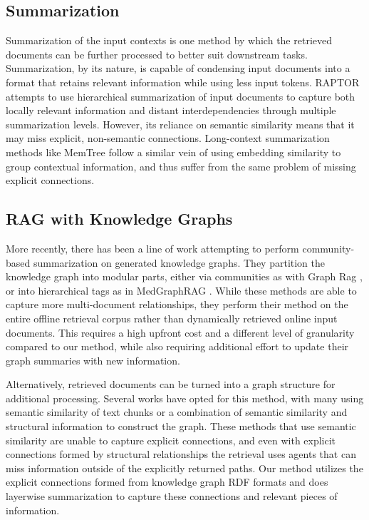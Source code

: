 \documentclass[11pt]{article}
\theoremstyle{definition}
\begin{document}
\subsection{Summarization}
Summarization of the input contexts is one method by which the retrieved documents can be further processed to better suit downstream tasks. Summarization, by its nature, is capable of condensing input documents into a format that retains relevant information while using less input tokens. RAPTOR \cite{DBLP:conf/iclr/SarthiATKGM24} attempts to use hierarchical summarization of input documents to capture both locally relevant information and distant interdependencies through multiple summarization levels. However, its reliance on semantic similarity means that it may miss explicit, non-semantic connections. Long-context summarization methods like MemTree \cite{DBLP:journals/corr/abs-2410-14052} follow a similar vein of using embedding similarity to group contextual information, and thus suffer from the same problem of missing explicit connections. 

\subsection{RAG with Knowledge Graphs}
More recently, there has been a line of work attempting to perform community-based summarization on generated knowledge graphs. They partition the knowledge graph into modular parts, either via communities as with Graph Rag \cite{DBLP:journals/corr/abs-2404-16130}, or into hierarchical tags as in MedGraphRAG \cite{DBLP:journals/corr/abs-2408-04187}. While these methods are able to capture more multi-document relationships, they perform their method on the entire offline retrieval corpus rather than dynamically retrieved online input documents. This requires a high upfront cost and a different level of granularity compared to our method, while also requiring additional effort to update their graph summaries with new information. 

Alternatively, retrieved documents can be turned into a graph structure for additional processing. Several works have opted for this method, with many using semantic similarity of text chunks or a combination of semantic similarity and structural information \cite{DBLP:conf/aaai/0160LRSZD24, DBLP:journals/corr/abs-2408-02907} to construct the graph. These methods that use semantic similarity are unable to capture explicit connections, and even with explicit connections formed by structural relationships the retrieval uses agents that can miss information outside of the explicitly returned paths. Our method utilizes the explicit connections formed from knowledge graph RDF formats and does layerwise summarization to capture these connections and relevant pieces of information.
\end{document}

